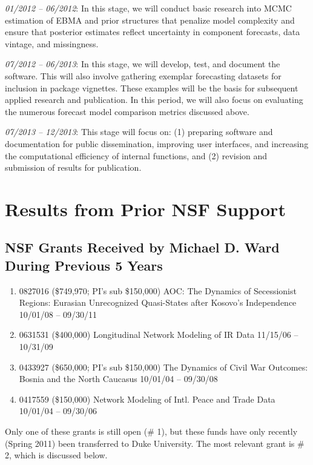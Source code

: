 \documentclass[pdftex,12pt,fullpage,oneside]{amsart}
\begin{document}



\noindent \textit{01/2012 -- 06/2012}: In this stage, we will conduct
basic research into MCMC estimation of EBMA and prior structures that
penalize model complexity and ensure that posterior estimates reflect
uncertainty in component forecasts, data vintage, and missingness.

\noindent \textit{07/2012 -- 06/2013}: In this stage, we will develop,
test, and document the software. This will also involve gathering
exemplar forecasting datasets for inclusion in package vignettes.
These examples will be the basis for subsequent applied research and
publication.  In this period, we will also focus on evaluating the
numerous forecast model comparison metrics discussed above.

\noindent \textit{07/2013 -- 12/2013}: This stage will focus on: (1)
preparing software and documentation for public dissemination,
improving user interfaces, and increasing the computational efficiency
of internal functions, and (2) revision and submission of results for
publication.



\section{Results from Prior NSF Support}


\subsection{NSF Grants Received by Michael D. Ward During Previous 5 Years}

\begin{enumerate}

\item 0827016 (\$749,970; PI's sub \$150,000) AOC: The Dynamics of
  Secessionist Regions: Eurasian Unrecognized Quasi-States after
  Kosovo's Independence 10/01/08 -- 09/30/11

\item 0631531 (\$400,000) Longitudinal Network Modeling of
  IR Data  11/15/06 -- 10/31/09

\item 0433927 (\$650,000; PI's sub \$150,000) The Dynamics of Civil
  War Outcomes: Bosnia and the North Caucasus 10/01/04 -- 09/30/08

\item 0417559 (\$150,000) Network Modeling of Intl. Peace and
  Trade Data 10/01/04 -- 09/30/06

\end{enumerate}  Only one of these grants is still open (\# 1), but these funds have
only recently (Spring 2011) been transferred to Duke University. The
most relevant grant is \# 2, which is discussed below. \vspace{.1in}
\end{document}
